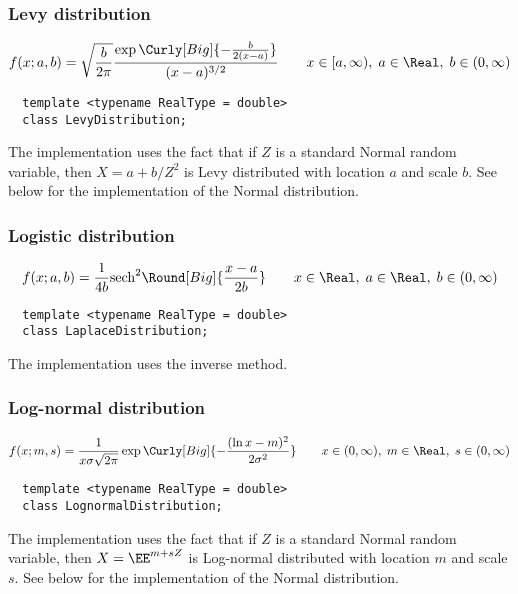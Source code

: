 \subsubsection{Levy distribution}

\begin{equation*}
  f(x;a,b) =
  \sqrt{\frac{b}{2\pi}}
  \frac{\exp\Curly[Big]{-\frac{b}{2(x - a)}}}{(x - a)^{3/2}} \qquad
  x \in [a, \infty),\; a \in \Real,\; b \in (0, \infty)
\end{equation*}
\begin{Verbatim}
  template <typename RealType = double>
  class LevyDistribution;
\end{Verbatim}
The implementation uses the fact that if $Z$ is a standard Normal random
variable, then $X = a + b / Z^2$ is Levy distributed with location $a$ and
scale $b$. See below for the implementation of the Normal distribution.

\subsubsection{Logistic distribution}

\begin{equation*}
  f(x;a,b) = \frac{1}{4b}\mathrm{sech}^2\Round[Big]{\frac{x - a}{2b}} \qquad
  x \in \Real,\; a \in \Real,\; b \in (0, \infty)
\end{equation*}
\begin{Verbatim}
  template <typename RealType = double>
  class LaplaceDistribution;
\end{Verbatim}
The implementation uses the inverse method.

\subsubsection{Log-normal distribution}

\begin{equation*}
  f(x;m,s) =
  \frac{1}{x\sigma\sqrt{2\pi}}
  \exp\Curly[Big]{-\frac{(\ln x - m)^2}{2\sigma^2}} \qquad
  x \in (0, \infty),\; m \in \Real,\; s \in (0, \infty)
\end{equation*}
\begin{Verbatim}
  template <typename RealType = double>
  class LognormalDistribution;
\end{Verbatim}
The implementation uses the fact that if $Z$ is a standard Normal random
variable, then $X = \EE^{m + sZ}$ is Log-normal distributed with location $m$
and scale $s$. See below for the implementation of the Normal distribution.

